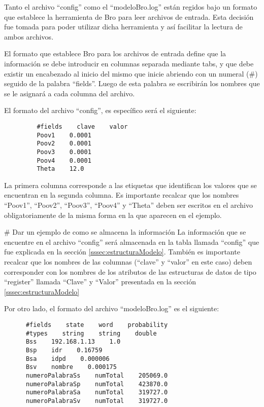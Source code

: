 Tanto el archivo “config” como el “modeloBro.log” están regidos bajo un formato que establece la herramienta de Bro para leer archivos de entrada. Esta decisión fue tomada para poder utilizar dicha herramienta y así facilitar la lectura de ambos archivos.

El formato que establece Bro para los archivos de entrada define que la información se debe introducir en columnas separada mediante tabs, y que debe existir un encabezado al inicio del mismo que inicie abriendo con un numeral (\#) seguido de la palabra “fields”. Luego de esta palabra se escribirán los nombres que se le asignará a cada columna del archivo.

El formato del archivo “config”, es específico será el siguiente:

\begin{verbatim}
         #fields    clave    valor
         Poov1    0.0001
         Poov2    0.0001
         Poov3    0.0001
         Poov4    0.0001
         Theta    12.0
\end{verbatim}

La primera columna corresponde a las etiquetas que identifican los valores que se encuentran en la segunda columna. Es importante recalcar que los nombres “Poov1”, “Poov2”, “Poov3”, “Poov4” y “Theta” deben ser escritos en el archivo obligatoriamente de la misma forma en la que aparecen en el ejemplo.

\# Dar un ejemplo de como se almacena la información
La información que se encuentre en el archivo “config” será almacenada en  la tabla llamada “config” que fue explicada en la sección \ref{sssec:estructuraModelo}. También es importante recalcar que los nombres de las columnas (“clave” y “valor” en este caso) deben corresponder con los nombres de los atributos de las estructuras de datos de tipo “register” llamada “Clave” y “Valor” presentada en la sección \ref{sssec:estructuraModelo}

Por otro lado, el formato del archivo “modeloBro.log” es el siguiente:

\begin{verbatim}
      #fields    state    word    probability
      #types    string    string    double
      Bss    192.168.1.13    1.0
      Bsp    idr    0.16759
      Bsa    idpd    0.000006
      Bsv    nombre    0.000175
      numeroPalabraSs    numTotal    205069.0
      numeroPalabraSp    numTotal    423870.0
      numeroPalabraSa    numTotal    319727.0
      numeroPalabraSv    numTotal    319727.0
\end{verbatim}

